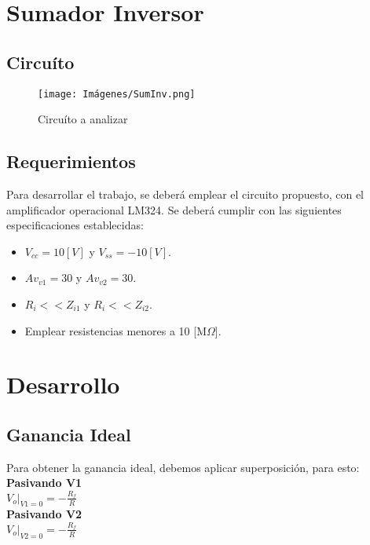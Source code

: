 \newpage


\section{Sumador Inversor}
\subsection{Circuíto}
    \begin{figure}[ht]
    	\centering
    	\texttt{[image: Imágenes/SumInv.png]}
    	\caption{Circuíto a analizar}
    \end{figure}

\subsection{Requerimientos}
    Para desarrollar el trabajo, se deberá emplear el circuito propuesto, con el amplificador operacional LM324. Se deberá cumplir con las siguientes especificaciones establecidas:\\
    \begin{itemize}
        \item $V_{cc} = 10 [V]$ y $V_{ss} = -10 [V]$.\\
        \item $Av_{v1} = 30$ y $Av_{v2} = 30$.\\
        \item $R_{i} << Z_{i1}$ y $R_{i} << Z_{i2}$.\\
        \item Emplear resistencias menores a 10 [M$\Omega$].\\
    \end{itemize}

    \newpage


\section{Desarrollo}
\subsection{Ganancia Ideal}
Para obtener la ganancia ideal, debemos aplicar superposición, para esto:\\

\textbf{Pasivando V1}\\
$V_{o}|_{V1 = 0} = -\frac{R_{f}}{R}$\\

\textbf{Pasivando V2}\\
$V_{o}|_{V2 = 0} = -\frac{R_{f}}{R}$\\

